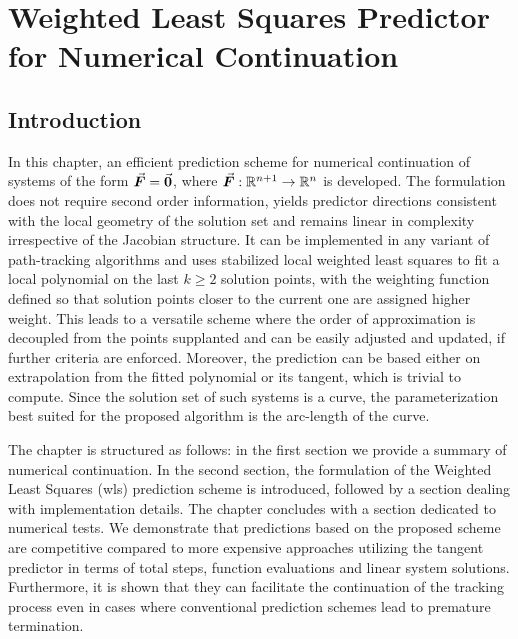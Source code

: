 \chapter{Weighted Least Squares Predictor for Numerical Continuation}\label{CH5}

\section{Introduction}\label{CH5-S1}

In this chapter, an efficient prediction 
scheme for numerical continuation of systems of the form $\vec{\bm{F}}=\vec{\bm{0}}$, 
where $\vec{\bm{F}}:\mathbb{R}^{n+1}\rightarrow\mathbb{R}^n$ 
is developed. The formulation does not require second order information, yields 
predictor 
directions consistent with the local geometry of the solution set and remains 
linear in complexity irrespective of the Jacobian structure. It can be 
implemented in any variant of path-tracking algorithms and uses
stabilized local
weighted least squares to fit a local polynomial on the last $k\geq 2$ solution
points, with the weighting function defined so that solution points closer to
the current one are assigned higher weight. This leads to a
versatile scheme where the order of approximation is decoupled from the
points supplanted and can be easily adjusted and updated, if further criteria
are enforced. Moreover, the prediction can be based either on extrapolation 
from the fitted polynomial or its tangent, which is trivial to compute. Since
the solution set of such systems is a curve, the parameterization best suited
for the proposed algorithm is the arc-length of the curve. 

The chapter is structured as follows: in the first section we provide a summary 
of 
numerical continuation. In the second section, the formulation of the Weighted 
Least Squares (\acrshort{wls}) prediction scheme is introduced, followed by a 
section dealing with implementation details. The chapter concludes with a 
section dedicated to numerical tests. We
demonstrate that predictions based on the proposed scheme are competitive
compared to more expensive approaches utilizing the tangent predictor in
terms of total steps, function evaluations and linear system solutions. 
Furthermore, it
is shown that they can facilitate the continuation of the tracking process 
even in cases where conventional prediction schemes lead to premature
termination. 


